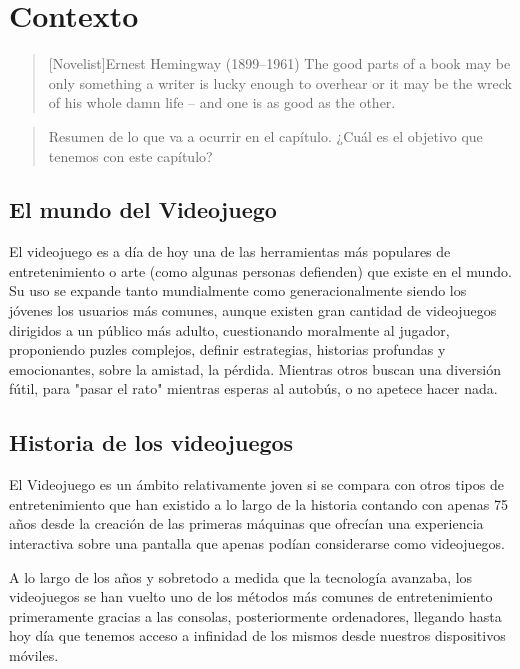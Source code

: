 \chapter{Contexto}

\begin{quotation}[Novelist]{Ernest Hemingway (1899--1961)}
The good parts of a book may be only something a writer is lucky enough to overhear or it may be the wreck of his whole damn life -- and one is as good as the other.
\end{quotation}

\begin{abstract}
Resumen de lo que va a ocurrir en el capítulo. ¿Cuál es el objetivo que tenemos con este capítulo?
\end{abstract}

\section{El mundo del Videojuego}
El videojuego es a día de hoy una de las herramientas más populares de entretenimiento o arte (como algunas personas defienden) que existe en el mundo. Su uso se expande tanto mundialmente como generacionalmente siendo los jóvenes los usuarios más comunes, aunque existen gran cantidad de videojuegos dirigidos a un público más adulto, cuestionando moralmente al jugador, proponiendo puzles complejos, definir estrategias, historias profundas y emocionantes, sobre la amistad, la pérdida. Mientras otros buscan una diversión fútil, para "pasar el rato" mientras esperas al autobús, o no apetece hacer nada.

\section{Historia de los videojuegos}
 El Videojuego es un ámbito relativamente joven si se compara con otros tipos de entretenimiento que han existido a lo largo de la historia contando con apenas 75 años desde la creación de las primeras máquinas que ofrecían una experiencia interactiva sobre una pantalla que apenas podían considerarse como videojuegos.

 A lo largo de los años y sobretodo a medida que la tecnología avanzaba, los videojuegos se han vuelto uno de los métodos más comunes de entretenimiento primeramente gracias a las consolas, posteriormente ordenadores, llegando hasta hoy día que tenemos acceso a infinidad de los mismos desde nuestros dispositivos móviles.

